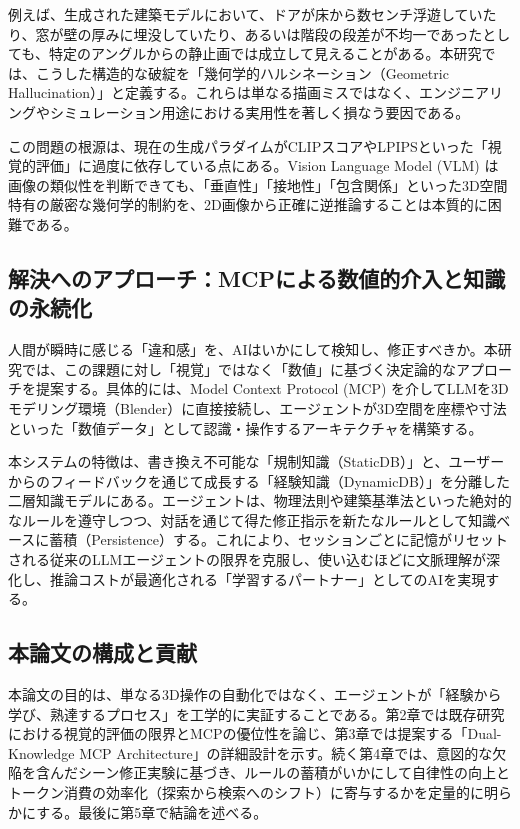 \documentclass[dvipdfmx, a4paper, 9pt]{deimj}
\begin{document}
例えば、生成された建築モデルにおいて、ドアが床から数センチ浮遊していたり、窓が壁の厚みに埋没していたり、あるいは階段の段差が不均一であったとしても、特定のアングルからの静止画では成立して見えることがある。本研究では、こうした構造的な破綻を「幾何学的ハルシネーション（Geometric Hallucination）」と定義する。これらは単なる描画ミスではなく、エンジニアリングやシミュレーション用途における実用性を著しく損なう要因である。

この問題の根源は、現在の生成パラダイムがCLIPスコア\cite{radford2021clip}やLPIPS\cite{zhang2018lpips}といった「視覚的評価」に過度に依存している点にある。Vision Language Model (VLM) は画像の類似性を判断できても、「垂直性」「接地性」「包含関係」といった3D空間特有の厳密な幾何学的制約を、2D画像から正確に逆推論することは本質的に困難である。

\subsection{解決へのアプローチ：MCPによる数値的介入と知識の永続化}

人間が瞬時に感じる「違和感」を、AIはいかにして検知し、修正すべきか。本研究では、この課題に対し「視覚」ではなく「数値」に基づく決定論的なアプローチを提案する。具体的には、Model Context Protocol (MCP)\cite{anthropic2024mcp} を介してLLMを3Dモデリング環境（Blender）に直接接続し、エージェントが3D空間を座標や寸法といった「数値データ」として認識・操作するアーキテクチャを構築する。

本システムの特徴は、書き換え不可能な「規制知識（StaticDB）」と、ユーザーからのフィードバックを通じて成長する「経験知識（DynamicDB）」を分離した二層知識モデルにある。エージェントは、物理法則や建築基準法といった絶対的なルールを遵守しつつ、対話を通じて得た修正指示を新たなルールとして知識ベースに蓄積（Persistence）する。これにより、セッションごとに記憶がリセットされる従来のLLMエージェントの限界を克服し、使い込むほどに文脈理解が深化し、推論コストが最適化される「学習するパートナー」としてのAIを実現する。

\subsection{本論文の構成と貢献}

本論文の目的は、単なる3D操作の自動化ではなく、エージェントが「経験から学び、熟達するプロセス」を工学的に実証することである。第2章では既存研究における視覚的評価の限界とMCPの優位性を論じ、第3章では提案する「Dual-Knowledge MCP Architecture」の詳細設計を示す。続く第4章では、意図的な欠陥を含んだシーン修正実験に基づき、ルールの蓄積がいかにして自律性の向上とトークン消費の効率化（探索から検索へのシフト）に寄与するかを定量的に明らかにする。最後に第5章で結論を述べる。
\end{document}
